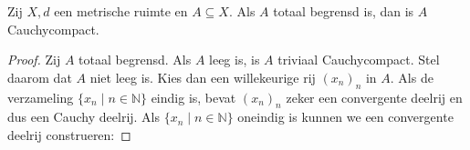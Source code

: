 \documentclass[main.tex]{subfiles}
\begin{document}
\begin{st}
  \label{st:totaal-begrensd-dan-cauchycompact}
  Zij $X,d$ een metrische ruimte en $A \subseteq X$.
  Als $A$ totaal begrensd is, dan is $A$ Cauchycompact.

  \begin{proof}
      Zij $A$ totaal begrensd.
      Als $A$ leeg is, is $A$ triviaal Cauchycompact.
      Stel daarom dat $A$ niet leeg is.
      Kies dan een willekeurige rij $(x_{n})_{n}$ in $A$.
      Als de verzameling $\{x_{n}\mid n\in \mathbb{N}\}$ eindig is, bevat $(x_{n})_{n}$ zeker een convergente deelrij en dus een Cauchy deelrij.
      Als $\{x_{n}\mid n\in \mathbb{N}\}$ oneindig is kunnen we een convergente deelrij construeren:
      

\end{proof}
\end{st}
\end{document}
